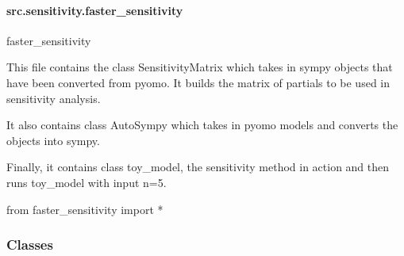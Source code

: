 \documentclass[letterpaper,10pt,english]{sphinxmanual}
\begin{document}
\sphinxstepscope


\paragraph{src.sensitivity.faster\_sensitivity}
\label{\detokenize{src.sensitivity.faster_sensitivity:module-src.sensitivity.faster_sensitivity}}\label{\detokenize{src.sensitivity.faster_sensitivity:src-sensitivity-faster-sensitivity}}\label{\detokenize{src.sensitivity.faster_sensitivity::doc}}
\sphinxAtStartPar
faster\_sensitivity

\sphinxAtStartPar
This file contains the class SensitivityMatrix which  takes in sympy objects that have been converted from pyomo. It builds the matrix of partials to be used in sensitivity analysis.

\sphinxAtStartPar
It also contains class AutoSympy which takes in pyomo models and converts the objects into sympy.

\sphinxAtStartPar
Finally, it contains class toy\_model, the sensitivity method in action and then runs toy\_model with input n=5.
\begin{description}
\sphinxAtStartPar
from faster\_sensitivity import *

\end{description}
\subsubsection*{Classes}
\end{document}
